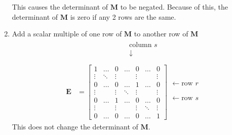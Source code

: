 \documentclass[11pt]{article}
\newcommand{\bm}[1]{\mathbf{#1}}
\begin{document}
\begin{enumerate}
\begin{equation}
\begin{matrix}
                \phantom{\vdots}\\
                \phantom{0}\\
            \end{matrix}
        \end{equation}
        This causes the determinant of $\bm{M}$ to be negated.  Because of this,
        the determinant of $\bm{M}$ is zero if any 2 rows are the same.
    \item Add a scalar multiple of one row of $\bm{M}$ to another row of $\bm{M}$
        \begin{equation}
        \begin{aligned}
            &\phantom{=} \begin{matrix}
                \phantom{0} & \phantom{\ldots} & \phantom{0} & \phantom{ll} & \text{column } s & \phantom{\ldots} & \phantom{0}\\
                \phantom{0} & \phantom{\ldots} & \phantom{0} & \phantom{ll} & \downarrow & \phantom{\ldots} & \phantom{0}\\
            \end{matrix} \\
            \bm{E} &= \begin{bmatrix}
                1 & \ldots & 0 & \ldots & 0 & \ldots & 0\\
                \vdots & \ddots & \vdots & & \vdots & & \vdots \\
                0 & \ldots & 0 & \ldots & 1 & \ldots & 0 \\
                \vdots & & \vdots & \ddots & \vdots & & \vdots \\
                0 & \ldots & 1 & \ldots & 0 & \ldots & 0 \\
                \vdots & & \vdots & & \vdots & \ddots & \vdots \\
                0 & \ldots & 0 & \ldots & 0 & \ldots & 1
            \end{bmatrix}
            \begin{matrix}
                \phantom{0}\\
                \phantom{\vdots}\\
                \leftarrow \text{row } r\\
                \phantom{\vdots}\\
                \leftarrow \text{row } s \\
                \phantom{\vdots}\\
                \phantom{0}\\
            \end{matrix}
        \end{aligned}
        \end{equation}
        This does not change the determinant of $\bm{M}$.
\end{enumerate}
\end{document}
